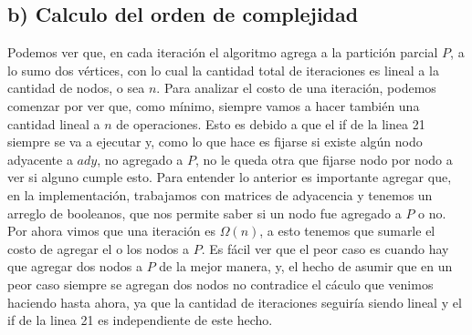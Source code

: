 \documentclass[a4paper]{article}
\begin{document}
\subsection*{b) Calculo del orden de complejidad}
Podemos ver que, en cada iteración el algoritmo agrega a la partición parcial $P$, a lo sumo dos vértices, con lo cual la cantidad total de iteraciones es lineal a la cantidad de nodos, o sea $n$. Para analizar el costo de una iteración, podemos comenzar por ver que, como mínimo, siempre vamos a hacer también una cantidad lineal a $n$ de operaciones. Esto es debido a que el if de la linea 21 siempre se va a ejecutar y, como lo que hace es fijarse si existe algún nodo adyacente a $ady$, no agregado a $P$, no le queda otra que fijarse nodo por nodo a ver si alguno cumple esto. Para entender lo anterior es importante agregar que, en la implementación, trabajamos con matrices de adyacencia y tenemos un arreglo de booleanos, que nos permite saber si un nodo fue agregado a $P$ o no. Por ahora vimos que una iteración es $\Omega(n)$, a esto tenemos que sumarle el costo de agregar el o los nodos a $P$. Es fácil ver que el peor caso es cuando hay que agregar dos nodos a $P$ de la mejor manera, y, el hecho de asumir que en un peor caso siempre se agregan dos nodos no contradice el cáculo que venimos haciendo hasta ahora, ya que la cantidad de iteraciones seguiría siendo lineal y el if de la linea 21 es independiente de este hecho.
\end{document}
